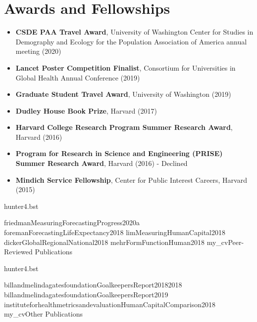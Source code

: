 \documentclass[letterpaper,11pt]{article}
\begin{document}
\section*{Awards and Fellowships}
\begin{itemize}[leftmargin=*, label={}]

\item \textbf{CSDE PAA Travel Award}, University of Washington Center for Studies in Demography and Ecology for the Population Association of America annual meeting (2020)  

\item \textbf{Lancet Poster Competition Finalist}, Consortium for Universities in Global Health Annual Conference (2019)

\item \textbf{Graduate Student Travel Award}, University of Washington (2019)

\item \textbf{Dudley House Book Prize}, Harvard (2017)

\item \textbf{Harvard College Research Program Summer Research Award}, Harvard (2016)

\item \textbf{Program for Research in Science and Engineering (PRISE) Summer Research Award}, Harvard (2016) - Declined

\item \textbf{Mindich Service Fellowship}, Center for Public Interest Careers, Harvard (2015)

\end{itemize}



{hunter4.bst}


\nocite{pr}{friedmanMeasuringForecastingProgress2020a}
\nocite{pr}{foremanForecastingLifeExpectancy2018}
\nocite{pr}{limMeasuringHumanCapital2018}
\nocite{pr}{dickerGlobalRegionalNational2018}
\nocite{pr}{mehrFormFunctionHuman2018}
{my_cv}{Peer-Reviewed Publications}



{hunter4.bst}

\nocite{other}{billandmelindagatesfoundationGoalkeepersReport20182018}
\nocite{other}{billandmelindagatesfoundationGoalkeepersReport2019}
\nocite{other}{instituteforhealthmetricsandevaluationHumanCapitalComparison2018}
{my_cv}{Other Publications}
\end{document}
